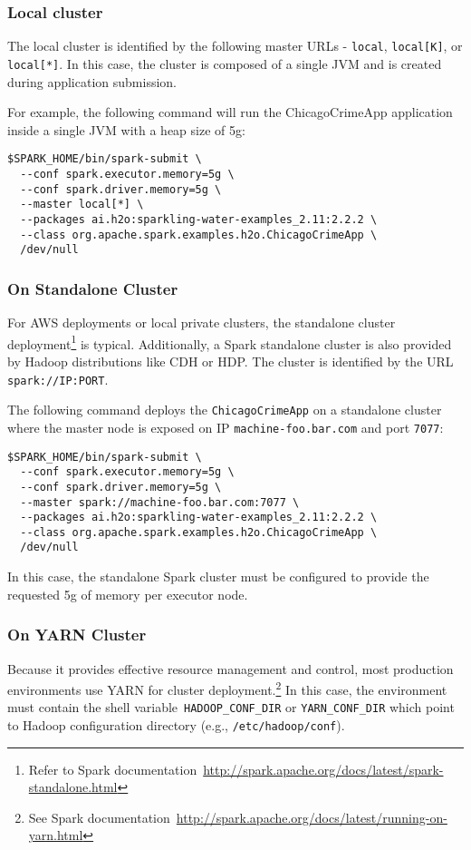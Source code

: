 \subsubsection{Local cluster}
The local cluster is identified by the following master URLs - \texttt{local}, \texttt{local[K]}, or \texttt{local[*]}. In this case, the cluster is composed of a single JVM and is created during application submission.

For example, the following command will run the ChicagoCrimeApp application inside a single JVM with a heap size of 5g:
\begin{lstlisting}[style=Bash]
$SPARK_HOME/bin/spark-submit \ 
  --conf spark.executor.memory=5g \
  --conf spark.driver.memory=5g \
  --master local[*] \
  --packages ai.h2o:sparkling-water-examples_2.11:2.2.2 \
  --class org.apache.spark.examples.h2o.ChicagoCrimeApp \
  /dev/null
\end{lstlisting}

\subsubsection{On Standalone Cluster}
For AWS deployments or local private clusters, the standalone cluster deployment\footnote{Refer to Spark documentation~\url{http://spark.apache.org/docs/latest/spark-standalone.html}} is typical. Additionally, a Spark standalone cluster is also provided by Hadoop distributions like CDH or HDP. The cluster is identified by the URL \texttt{spark://IP:PORT}.

The following command deploys the \texttt{ChicagoCrimeApp} on a standalone cluster where the master node is exposed on IP \texttt{machine-foo.bar.com} and port \texttt{7077}:

\begin{lstlisting}[style=Bash]
$SPARK_HOME/bin/spark-submit \ 
  --conf spark.executor.memory=5g \
  --conf spark.driver.memory=5g \
  --master spark://machine-foo.bar.com:7077 \
  --packages ai.h2o:sparkling-water-examples_2.11:2.2.2 \
  --class org.apache.spark.examples.h2o.ChicagoCrimeApp \
  /dev/null
\end{lstlisting}

In this case, the standalone Spark cluster must be configured to provide the requested 5g of memory per executor node. 

\subsubsection{On YARN Cluster}
Because it provides effective resource management and control, most production environments use YARN for cluster deployment.\footnote{See Spark documentation~\url{http://spark.apache.org/docs/latest/running-on-yarn.html}} 
In this case, the environment must contain the shell variable~\texttt{HADOOP\_CONF\_DIR} or \texttt{YARN\_CONF\_DIR} which point to Hadoop configuration directory (e.g., \texttt{/etc/hadoop/conf}).

